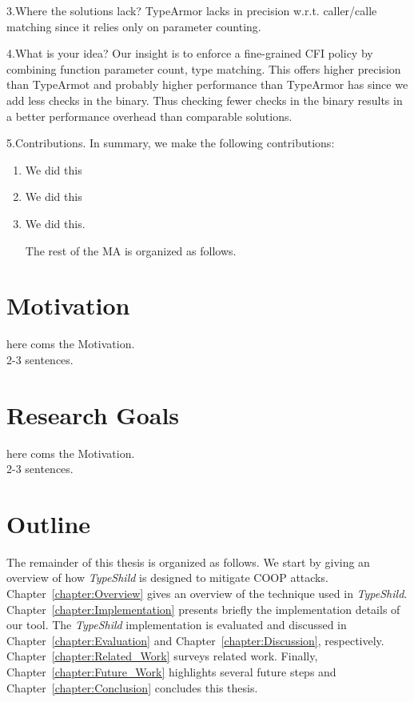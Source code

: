 
3.Where the solutions lack?
TypeArmor lacks in precision w.r.t. caller/calle matching since it relies only on parameter counting.

4.What is your idea?
Our insight is to enforce a fine-grained CFI policy by combining function parameter count, type matching.
This offers higher precision than TypeArmot and probably higher performance than TypeArmor has since we 
add less checks in the binary. Thus checking fewer checks in the binary results in a better performance 
overhead than comparable solutions.

5.Contributions.
In summary, we make the following contributions:

\begin{enumerate}
 \item We did this 
 
 \item We did this 
 
 \item We did this.
 
 The rest of the MA is organized as follows.
 
\end{enumerate}

\section{Motivation}
here coms the Motivation.
\\
2-3 sentences.

\section{Research Goals}
here coms the Motivation.
\\
2-3 sentences.

\section{Outline}
The remainder of this thesis is organized as follows.
We start by giving an overview of how \textit{TypeShild}
is designed to mitigate COOP attacks. 
Chapter~\ref{chapter:Overview} gives an overview of the technique
used in \textit{TypeShild}.
Chapter~\ref{chapter:Implementation} presents briefly the implementation
details of our tool.
The \textit{TypeShild} implementation is evaluated and discussed in
Chapter~\ref{chapter:Evaluation} and Chapter~\ref{chapter:Discussion}, respectively.
Chapter~\ref{chapter:Related_Work} surveys related work.
Finally, Chapter~\ref{chapter:Future_Work} highlights several future steps and
Chapter~\ref{chapter:Conclusion} concludes this thesis.


